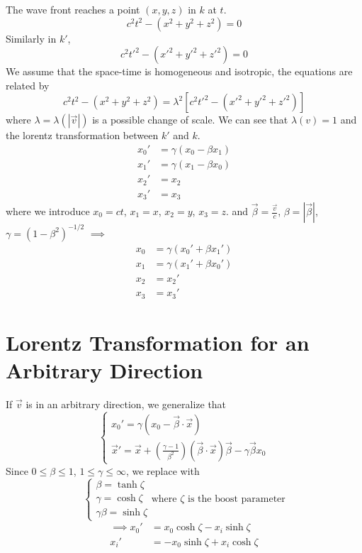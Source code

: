 \documentclass{article}
\begin{document}
	The wave front reaches a point $(x, y, z)$ in $k$ at $t$.
	\[ c^2t^2 - (x^2 + y^2 + z^2) = 0 \]
	Similarly in $k'$,
	\[ c^2t'^2 - (x'^2 + y'^2 + z'^2) = 0 \]
	We assume that the space-time is homogeneous and isotropic, the equations are related by
	\[ c^2t^2 - (x^2 + y^2 + z^2) = \lambda^2 [c^2t'^2 - (x'^2 + y'^2 + z'^2)] \]
	where $\lambda = \lambda(|\vec{v}|)$ is a possible change of scale.
	We can see that $\lambda(v)=1$ and the lorentz transformation between $k'$ and $k$.
	\begin{align*}
		x_0' &= \gamma (x_0 - \beta x_1) \\
		x_1' &= \gamma (x_1 - \beta x_0) \\
		x_2' &= x_2 \\
		x_3' &= x_3
	\end{align*}
	where we introduce $x_0 = ct$, $x_1 = x$, $x_2 = y$, $x_3 = z$.
	and $\vec{\beta} = \frac{\vec{v}}{c}$, $\beta = |\vec{\beta}|$, $\gamma = (1-\beta^2)^{-1/2}$
	$\implies$
	\begin{align*}
		x_0 &= \gamma (x_0' + \beta x_1') \\
		x_1 &= \gamma (x_1' + \beta x_0') \\
		x_2 &= x_2' \\
		x_3 &= x_3'
	\end{align*}
	\section*{Lorentz Transformation for an Arbitrary Direction}
	If $\vec{v}$ is in an arbitrary direction, we generalize that
	\[
	\begin{cases}
		x_0' = \gamma(x_0 - \vec{\beta} \cdot \vec{x}) \\
		\vec{x}' = \vec{x} + (\frac{\gamma - 1}{\beta^2})(\vec{\beta} \cdot \vec{x})\vec{\beta} - \gamma \vec{\beta} x_0
	\end{cases}
	\]
	Since $0 \le \beta \le 1$, $1 \le \gamma \le \infty$, we replace with
	\[
	\begin{cases}
		\beta = \tanh \zeta \\
		\gamma = \cosh \zeta \\
		\gamma\beta = \sinh \zeta
	\end{cases}
	\text{where } \zeta \text{ is the boost parameter}
	\]
	\begin{align*}
		\implies
		x_0' &= x_0 \cosh\zeta - x_i \sinh\zeta \\
		x_i' &= -x_0 \sinh\zeta + x_i \cosh\zeta
	\end{align*}
	
\end{document}
